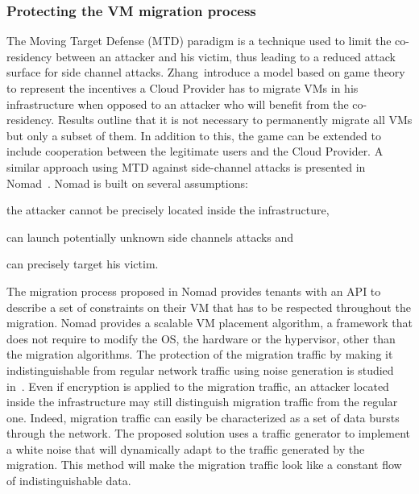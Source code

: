 \subsubsection{Protecting the VM migration process}
The Moving Target Defense (MTD) paradigm is a technique used to limit the co-residency between an attacker and his victim, thus leading to a reduced attack surface for side channel attacks.
Zhang~\etal introduce a model based on game theory~\cite{incentivemtd-Zhang2012} to represent the incentives a Cloud Provider has to migrate VMs in his infrastructure when opposed to an attacker who will benefit from the co-residency. Results outline that it is not necessary to permanently migrate all VMs but only a subset of them. In addition to this, the game can be extended to include cooperation between the legitimate users and the Cloud Provider.
A similar approach using MTD against side-channel attacks is presented in Nomad~\cite{nomad-Moon2015b}. Nomad is built on several assumptions: 
\begin{inparaenum}[i)]
\item the attacker cannot be precisely located inside the infrastructure,
\item can launch potentially unknown side channels attacks and 
\item can precisely target his victim.
\end{inparaenum}
The migration process proposed in Nomad provides tenants with an API to describe a set of constraints on their VM that has to be respected throughout the migration.
Nomad provides a scalable VM placement algorithm, a framework that does not require to modify the OS, the hardware or the hypervisor, other than the migration algorithms.
The protection of the migration traffic by making it indistinguishable from regular network traffic using noise generation is studied in~\cite{stealth-Achleitner2017a}. Even if encryption is applied to the migration traffic, an attacker located inside the infrastructure may still distinguish migration traffic from the regular one. Indeed, migration traffic can easily be characterized as a set of data bursts through the network. The proposed solution uses a traffic generator to implement a white noise that will dynamically adapt to the traffic generated by the migration. This method will make the migration traffic look like a constant flow of indistinguishable data.

